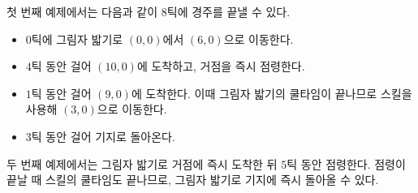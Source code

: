 첫 번째 예제에서는 다음과 같이 $8$틱에 경주를 끝낼 수 있다.
\begin{itemize}
\item $0$틱에 그림자 밟기로 $(0,0)$에서 $(6,0)$으로 이동한다.
\item $4$틱 동안 걸어 $(10,0)$에 도착하고, 거점을 즉시 점령한다.
\item $1$틱 동안 걸어 $(9,0)$에 도착한다. 이때 그림자 밟기의 쿨타임이 끝나므로 스킬을 사용해 $(3,0)$으로 이동한다.
\item $3$틱 동안 걸어 기지로 돌아온다.
\end{itemize}

두 번째 예제에서는 그림자 밟기로 거점에 즉시 도착한 뒤 $5$틱 동안 점령한다. 점령이 끝날 때 스킬의 쿨타임도 끝나므로, 그림자 밟기로 기지에 즉시 돌아올 수 있다.
